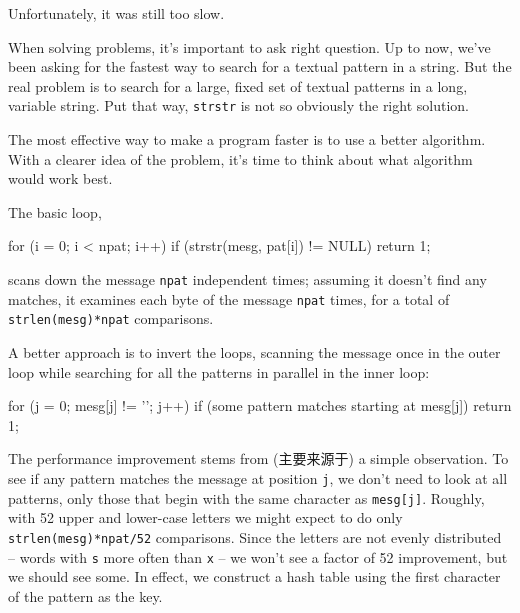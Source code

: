 Unfortunately, it was still too slow.

When solving problems, it's important to ask right question. Up to now,
we've been asking for the fastest way to search for a textual pattern in a
string. But the real problem is to search for a large, fixed set of textual
patterns in a long, variable string. Put that way, \verb'strstr' is not so
obviously the right solution.

The most effective way to make a program faster is to use a better
algorithm.  With a clearer idea of the problem, it's time to think about
what algorithm would work best.

The basic loop,
\begin{wellcode}
    for (i = 0; i < npat; i++)
        if (strstr(mesg, pat[i]) != NULL)
            return 1;
\end{wellcode}
scans down the message \verb'npat' independent times; assuming it doesn't
find any matches, it examines each byte of the message \verb'npat' times,
for a total of \verb'strlen(mesg)*npat' comparisons.

A better approach is to invert the loops, scanning the message once in the
outer loop while searching for all the patterns in parallel in the inner loop:
\begin{wellcode}
    for (j = 0; mesg[j] != '\0'; j++)
        if (some pattern matches starting at mesg[j])
            return 1;
\end{wellcode}
The performance improvement stems from (主要来源于) a simple observation.
To see if any pattern matches the message at position \verb'j', we don't
need to look at all patterns, only those that begin with the same character
as \verb'mesg[j]'. Roughly, with 52 upper and lower-case letters we might
expect to do only \verb'strlen(mesg)*npat/52' comparisons. Since the
letters are not evenly distributed -- words with \verb's' more often than
\verb'x' -- we won't see a factor of 52 improvement, but we should see
some. In effect, we construct a hash table using the first character of the
pattern as the key.

